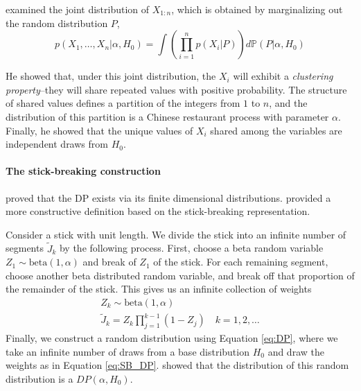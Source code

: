\cite{ferguson73} examined the joint distribution of $X_{1:n}$, which is obtained by marginalizing out the random distribution $P$,
\begin{equation}
p(X_1,\dots,X_n|\alpha,H_0) = \int{\left(\prod_{i=1}^n p(X_i|P) \right) d \mathbb{P}(P|\alpha,H_0)}
\end{equation}

He showed that, under this joint distribution, the $X_i$ will exhibit a \textit{clustering property}--they will share repeated values with positive probability. The structure of shared values defines a partition of the integers from $1$ to $n$, and the distribution of this partition is a Chinese restaurant process with parameter $\alpha$. Finally, he showed that the unique values of $X_i$ shared among the variables are independent draws from $H_0$.

\paragraph{The stick-breaking construction}
\cite{ferguson73} proved that the DP exists via its finite dimensional distributions. \cite{sethuraman94} provided a more constructive definition based on the stick-breaking representation.

Consider a stick with unit length. We divide the stick into an infinite number of segments $\tilde{J}_k$ by the following process. First, choose a beta random variable $Z_1 \sim \text{beta}(1, \alpha)$ and break of $Z_1$ of the stick. For each remaining segment, choose another beta distributed random variable, and break off that proportion of the remainder of the stick. This gives us an infinite collection of weights 
\begin{gather}
Z_k \sim \text{beta}(1, \alpha) \\
\tilde{J}_k = Z_k \prod_{j=1}^{k-1}(1-Z_j) \quad k= 1,2,\dots \label{eq:SB_DP}
\end{gather}
Finally, we construct a random distribution using Equation \ref{eq:DP}, where we take an infinite number of draws from a base distribution $H_0$ and draw the weights as in Equation \ref{eq:SB_DP}. \cite{sethuraman94} showed that the distribution of this random distribution is a $DP(\alpha,H_0)$.

